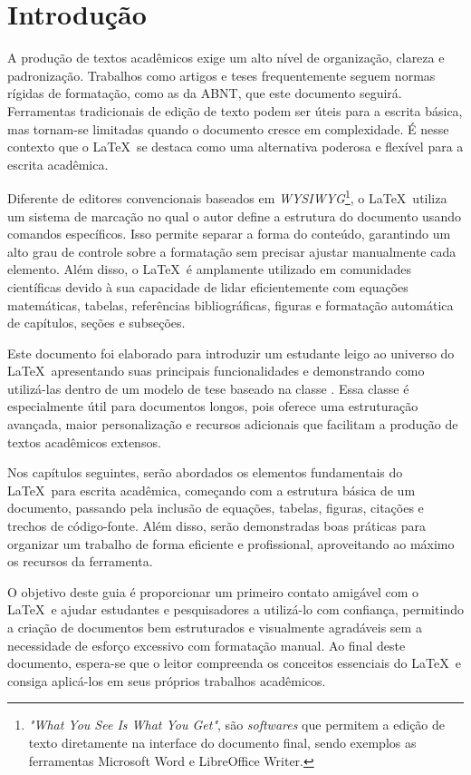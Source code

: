 \chapter{Introdução}

A produção de textos acadêmicos exige um alto nível de organização, clareza e padronização. Trabalhos como artigos e teses frequentemente seguem normas rígidas de formatação, como as da ABNT, que este documento seguirá. Ferramentas tradicionais de edição de texto podem ser úteis para a escrita básica, mas tornam-se limitadas quando o documento cresce em complexidade. É nesse contexto que o \LaTeX\ se destaca como uma alternativa poderosa e flexível para a escrita acadêmica.

Diferente de editores convencionais baseados em \textit{WYSIWYG}\footnote{\textit{"What You See Is What You Get"}, são \textit{softwares} que permitem a edição de texto diretamente na interface do documento final, sendo exemplos as ferramentas Microsoft Word e LibreOffice Writer.}, o \LaTeX\ utiliza um sistema de marcação no qual o autor define a estrutura do documento usando comandos específicos. Isso permite separar a forma do conteúdo, garantindo um alto grau de controle sobre a formatação sem precisar ajustar manualmente cada elemento. Além disso, o \LaTeX\ é amplamente utilizado em comunidades científicas devido à sua capacidade de lidar eficientemente com equações matemáticas, tabelas, referências bibliográficas, figuras e formatação automática de capítulos, seções e subseções.

Este documento foi elaborado para introduzir um estudante leigo ao universo do \LaTeX\, apresentando suas principais funcionalidades e demonstrando como utilizá-las dentro de um modelo de tese baseado na classe \abnTeX. Essa classe é especialmente útil para documentos longos, pois oferece uma estruturação avançada, maior personalização e recursos adicionais que facilitam a produção de textos acadêmicos extensos.

Nos capítulos seguintes, serão abordados os elementos fundamentais do \LaTeX\ para escrita acadêmica, começando com a estrutura básica de um documento, passando pela inclusão de equações, tabelas, figuras, citações e trechos de código-fonte. Além disso, serão demonstradas boas práticas para organizar um trabalho de forma eficiente e profissional, aproveitando ao máximo os recursos da ferramenta.

O objetivo deste guia é proporcionar um primeiro contato amigável com o \LaTeX\ e ajudar estudantes e pesquisadores a utilizá-lo com confiança, permitindo a criação de documentos bem estruturados e visualmente agradáveis sem a necessidade de esforço excessivo com formatação manual. Ao final deste documento, espera-se que o leitor compreenda os conceitos essenciais do \LaTeX\ e consiga aplicá-los em seus próprios trabalhos acadêmicos.